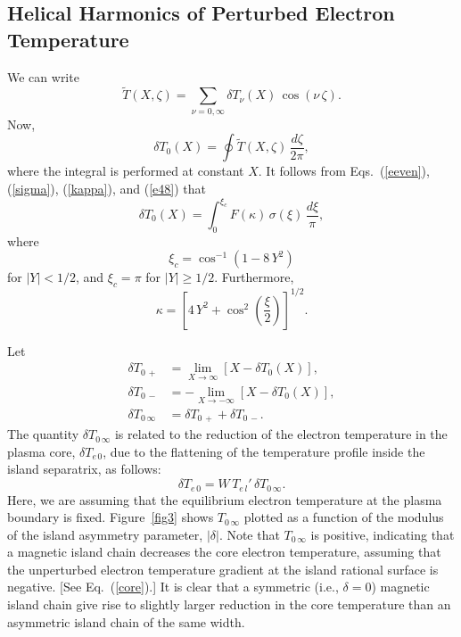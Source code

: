 \documentclass[12pt,prb,aps]{revtex4-1}
\begin{document}
\subsection{Helical Harmonics of Perturbed Electron Temperature}
We can write
\begin{equation}
\tilde{T}(X,\zeta)=\sum_{\nu=0,\infty}\delta T_\nu(X)\,\cos(\nu\,\zeta).
\end{equation}
Now,
\begin{equation}
\delta T_0(X) = \oint \tilde{T}(X,\zeta)\,\frac{d\zeta}{2\pi},
\end{equation}
where the integral is performed at constant $X$. It follows from Eqs.~(\ref{eeven}), (\ref{sigma}),  (\ref{kappa}), and (\ref{e48}) that
\begin{equation}
\delta T_0(X) = \int_0^{\xi_c}F(\kappa)\,\sigma(\xi)\,\frac{d\xi}{\pi},
\end{equation}
where 
\begin{equation}
\xi_c = \cos^{-1}(1-8\,Y^2)
\end{equation}
for $|Y|<1/2$, and $\xi_c=\pi$ for $|Y|\geq 1/2$. Furthermore,
\begin{equation}
\kappa =\left[4\,Y^2 +\cos^2\left(\frac{\xi}{2}\right)\right]^{1/2}.
\end{equation}

Let 
\begin{align}\label{e79}
\delta T_{0\,+} &=\lim_{X\rightarrow \infty}\left[X - \delta T_0(X)\right],\\[0.5ex]
\delta T_{0\,-} &=-\lim_{X\rightarrow -\infty}\left[X - \delta T_0(X)\right],\\[0.5ex]
\delta T_{0\,\infty} &= \delta T_{0\,+}+ \delta T_{0\,-}.
\end{align}
The quantity $\delta T_{0\,\infty}$ is related to the reduction of the electron temperature in the plasma core, $\delta T_{e\,0}$, due to the flattening of the
temperature profile inside the island separatrix, as follows:
\begin{equation}\label{core}
\delta T_{e\,0} = W\,T_{e\,l}'\,\delta T_{0\,\infty}.
\end{equation}
Here, we are assuming that the equilibrium electron temperature at the plasma boundary is fixed.\cite{chang}
Figure~\ref{fig3} shows $T_{0\,\infty}$ plotted as a function of the modulus of the island asymmetry parameter, $|\delta|$.  
Note that $T_{0\,\infty}$ is positive, indicating that a magnetic island chain decreases the core electron temperature, assuming that the
unperturbed electron temperature gradient at the island rational surface is negative. [See Eq.~(\ref{core}).] It is clear that a symmetric (i.e., $\delta=0$) magnetic
island chain give rise to slightly larger reduction in the core temperature than an asymmetric island chain of the same width. 
\end{document}
